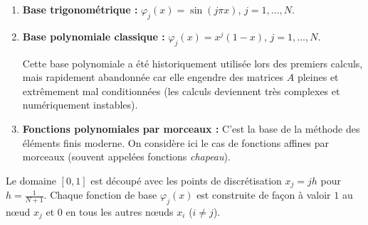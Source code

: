 \begin{enumerate}
    \item \textbf{Base trigonométrique :} $\varphi_j(x) = \sin(j \pi x)$, $j=1, \dots, N$.
    \item \textbf{Base polynomiale classique :} $\varphi_j(x) = x^j(1-x)$, $j=1, \dots, N$. 
    
    \begin{remarque}
    Cette base polynomiale a été historiquement utilisée lors des premiers calculs, mais rapidement abandonnée car elle engendre des matrices $A$ pleines et extrêmement mal conditionnées (les calculs deviennent très complexes et numériquement instables).
    \end{remarque}
    
    \item \textbf{Fonctions polynomiales par morceaux :} C'est la base de la méthode des éléments finis moderne. On considère ici le cas de fonctions affines par morceaux (souvent appelées fonctions \textit{chapeau}).
\end{enumerate}

Le domaine $[0, 1]$ est découpé avec les points de discrétisation $x_j = j h$ pour $h = \frac{1}{N+1}$. Chaque fonction de base $\varphi_j(x)$ est construite de façon à valoir $1$ au nœud $x_j$ et $0$ en tous les autres nœuds $x_i$ ($i \neq j$). 

